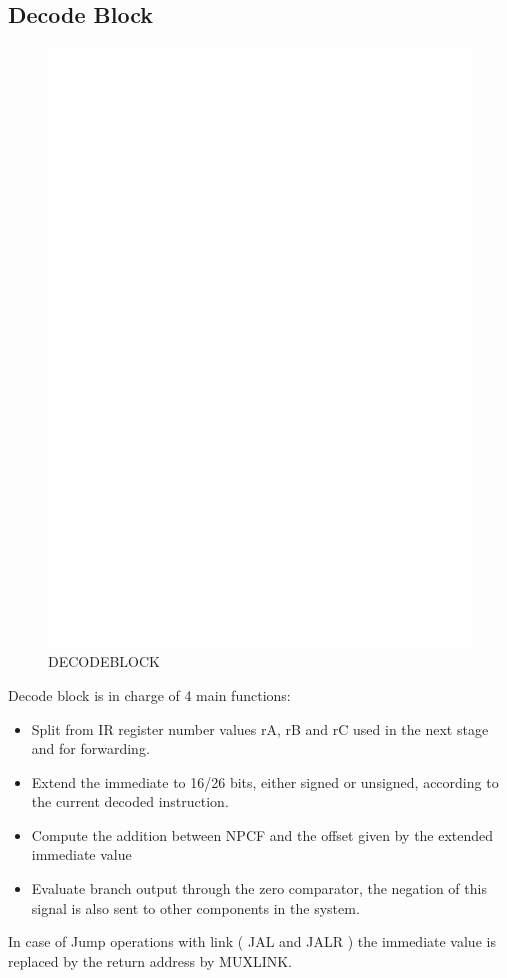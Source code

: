 \documentclass[12pt]{article}
\begin{document}
\subsection{Decode Block}
\begin{figure}[h!]
	\includegraphics[width=\textwidth, center]{images/DECODE_BLOCK.eps}
	\caption{DECODEBLOCK}
	\label{DECODEBLOCK}
\end{figure}
Decode block is in charge of 4 main functions:
\begin{itemize}
	\item Split from IR register number values rA, rB and rC used in the next stage and for forwarding.
	\item Extend the immediate to 16/26 bits, either signed or unsigned, according to the current decoded instruction.
	\item Compute the addition between NPCF and the offset given by the extended immediate value
	\item Evaluate branch output through the zero comparator, the negation of this signal is also sent to other components in the system.
\end{itemize}
In case of Jump operations with link ( JAL and JALR ) the immediate value is replaced by the return address by MUXLINK.
\end{document}
